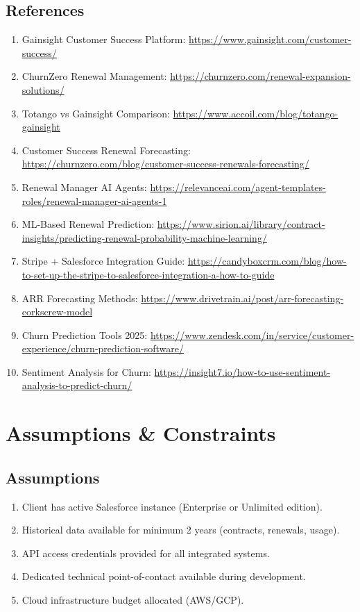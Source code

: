 \documentclass[12pt,a4paper]{article}
\begin{document}
\subsection{References}
\begin{enumerate}
    \item Gainsight Customer Success Platform: \url{https://www.gainsight.com/customer-success/}
    \item ChurnZero Renewal Management: \url{https://churnzero.com/renewal-expansion-solutions/}
    \item Totango vs Gainsight Comparison: \url{https://www.accoil.com/blog/totango-gainsight}
    \item Customer Success Renewal Forecasting: \url{https://churnzero.com/blog/customer-success-renewals-forecasting/}
    \item Renewal Manager AI Agents: \url{https://relevanceai.com/agent-templates-roles/renewal-manager-ai-agents-1}
    \item ML-Based Renewal Prediction: \url{https://www.sirion.ai/library/contract-insights/predicting-renewal-probability-machine-learning/}
    \item Stripe + Salesforce Integration Guide: \url{https://candyboxcrm.com/blog/how-to-set-up-the-stripe-to-salesforce-integration-a-how-to-guide}
    \item ARR Forecasting Methods: \url{https://www.drivetrain.ai/post/arr-forecasting-corkscrew-model}
    \item Churn Prediction Tools 2025: \url{https://www.zendesk.com/in/service/customer-experience/churn-prediction-software/}
    \item Sentiment Analysis for Churn: \url{https://insight7.io/how-to-use-sentiment-analysis-to-predict-churn/}
\end{enumerate}

\section{Assumptions \& Constraints}

\subsection{Assumptions}
\begin{enumerate}
    \item Client has active Salesforce instance (Enterprise or Unlimited edition).
    \item Historical data available for minimum 2 years (contracts, renewals, usage).
    \item API access credentials provided for all integrated systems.
    \item Dedicated technical point-of-contact available during development.
    \item Cloud infrastructure budget allocated (AWS/GCP).
\end{enumerate}
\end{document}
